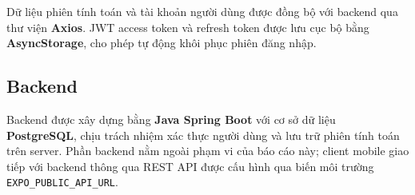 Dữ liệu phiên tính toán và tài khoản người dùng được đồng bộ với backend
qua thư viện \textbf{Axios}.
JWT access token và refresh token được lưu cục bộ bằng \textbf{AsyncStorage},
cho phép tự động khôi phục phiên đăng nhập.

\subsection{Backend}

Backend được xây dựng bằng \textbf{Java Spring Boot} với cơ sở dữ liệu \textbf{PostgreSQL},
chịu trách nhiệm xác thực người dùng và lưu trữ phiên tính toán trên server.
Phần backend nằm ngoài phạm vi của báo cáo này; client mobile giao tiếp với backend
thông qua REST API được cấu hình qua biến môi trường \texttt{EXPO\_PUBLIC\_API\_URL}.
